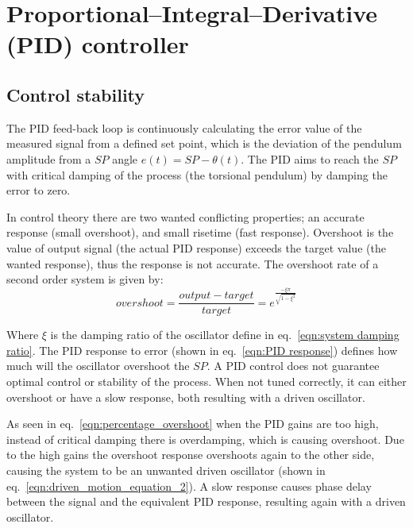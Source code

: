 \documentclass[\main/master.tex]{subfiles}
\begin{document}
\section{Proportional–Integral–Derivative (PID) controller}
\subsection{Control stability}
The PID feed-back loop is continuously calculating the error value of the measured signal from a defined set point, which is the deviation of the pendulum amplitude from a $SP$ angle $e(t) =SP -\theta(t) $. The PID aims to reach the $SP$ with critical damping of the process (the torsional pendulum) by damping the error to zero. 
\par\noindent
In control theory there are two wanted conflicting properties; an accurate response (small overshoot), and small risetime (fast response). Overshoot is the value of output signal (the actual PID response) exceeds the target value (the wanted response), thus the response is not accurate. The overshoot rate of a second order system is given by:
\begin{equation}
overshoot =  \frac{output-target}{target} = e ^{\frac{-\xi\pi}{\sqrt{1-\xi^2}}}  \label{eqn:overshoot}
\end{equation}
\par\noindent
Where $\xi$ is the damping ratio of the oscillator define in eq.~\ref{eqn:system damping ratio}. The PID response to error (shown in eq.~\ref{eqn:PID response}) defines how much will the oscillator overshoot the $SP$. A PID control does not guarantee optimal control or stability of the process. When not tuned correctly, it can either overshoot or have a slow response, both resulting with a driven oscillator.
\par\noindent
As seen in eq.~\ref{eqn:percentage_overshoot} when the PID gains are too high, instead of critical damping there is overdamping, which is causing overshoot. Due to the high gains the overshoot response overshoots again to the other side, causing the system to be an unwanted driven oscillator (shown in eq.~\ref{eqn:driven_motion_equation_2}). A slow response causes phase delay between the signal and the equivalent PID response, resulting  again with a driven oscillator.
\end{document}
